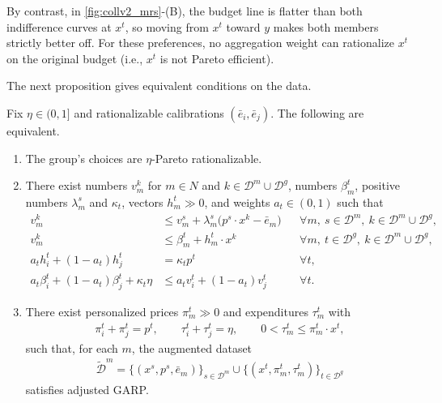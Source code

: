 \documentclass[11 pt]{article}
\begin{document}
By contrast, in \autoref{fig:collv2_mrs}-(B), the budget line is flatter than both indifference curves at $x^t$, so moving from $x^t$ toward $y$ makes both members strictly better off. For these preferences, no aggregation weight can rationalize $x^t$ on the original budget (i.e., $x^t$ is not Pareto efficient).

The next proposition gives equivalent conditions on the data.

\begin{proposition}\label{prop:collv2_afriat}
Fix $\eta \in (0,1]$ and rationalizable calibrations $(\bar e_{i}, \bar e_{j})$. The following are equivalent.
\begin{enumerate}
\item[(i)] The group's choices are $\eta$-Pareto rationalizable.
\item[(ii)] There exist numbers $v_{m}^{k}$ for $m \in N$ and $k \in \mathcal{D}^{m} \cup \mathcal{D}^{g}$, numbers $\beta_{m}^{t}$, positive numbers $\lambda_{m}^{s}$ and $\kappa_{t}$, vectors $h_{m}^{t} \gg 0$, and weights $a_{t} \in (0,1)$ such that
\begin{align}
v_{m}^{k} &\leq v_{m}^{s} + \lambda_{m}^{s} \bigl( p^{s} \cdot x^{k} - \bar e_{m} \bigr) && \forall m,\ s \in \mathcal{D}^{m},\ k \in \mathcal{D}^{m} \cup \mathcal{D}^{g}, \label{eqn:collv2_I}\\
v_{m}^{k} &\leq \beta_{m}^{t} + h_{m}^{t} \cdot x^{k} && \forall m,\ t \in \mathcal{D}^{g},\ k \in \mathcal{D}^{m} \cup \mathcal{D}^{g}, \label{eqn:collv2_S}\\
a_{t} h_{i}^{t} + (1-a_{t}) h_{j}^{t} &= \kappa_{t} p^{t} && \forall t, \label{eqn:collv2_P}\\
a_{t} \beta_{i}^{t} + (1-a_{t}) \beta_{j}^{t} + \kappa_{t} \eta &\leq a_{t} v_{i}^{t} + (1-a_{t}) v_{j}^{t} && \forall t. \label{eqn:collv2_B}
\end{align}
\item[(iii)] There exist personalized prices $\pi_{m}^{t} \gg 0$ and expenditures $\tau_{m}^{t}$ with
\begin{align*}
\pi_{i}^{t} + \pi_{j}^{t} = p^{t}, \qquad \tau_{i}^{t} + \tau_{j}^{t} = \eta, \qquad 0 < \tau_{m}^{t} \leq \pi_{m}^{t} \cdot x^{t},
\end{align*}
such that, for each $m$, the augmented dataset
\begin{align*}
\widetilde{\mathcal{D}}^{m} = \bigl\{ (x^{s}, p^{s}, \bar e_{m}) \bigr\}_{s \in \mathcal{D}^{m}} \cup \bigl\{ (x^{t}, \pi_{m}^{t}, \tau_{m}^{t}) \bigr\}_{t \in \mathcal{D}^{g}}
\end{align*}
satisfies adjusted GARP.
\end{enumerate}
\end{proposition}
\end{document}
